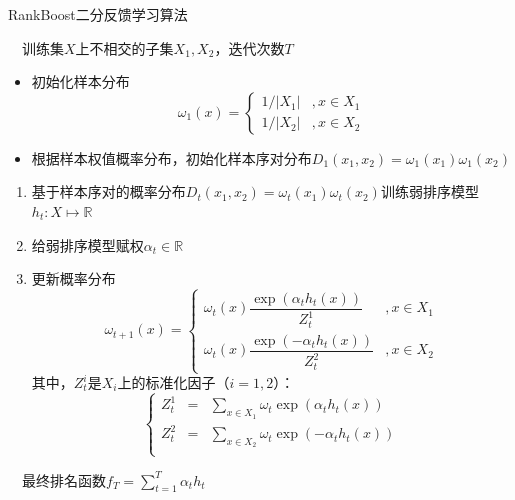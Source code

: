 \begin{algorithm}[htbp]
        \caption{RankBoost二分反馈学习算法}
        \begin{algorithmic}
            \REQUIRE ~~训练集$X$上不相交的子集$X_1,X_2$，迭代次数$T$\\
            \STATE
            \begin{itemize}
              \item 初始化样本分布
              \begin{equation}
                \omega_1(x) = \left\{
                    \begin{array}{ll}
                      1/|X_1| & ,  x\in X_1 \\
                      1/|X_2| & ,  x\in X_2
                    \end{array}
                \right.
              \end{equation}
              \item 根据样本权值概率分布，初始化样本序对分布$D_1(x_1,x_2) = \omega_1(x_1)\omega_1(x_2)$
            \end{itemize}
            \STATE
            \begin{enumerate}
              \item 基于样本序对的概率分布$D_t(x_1,x_2) = \omega_t(x_1)\omega_t(x_2)$训练弱排序模型$h_t:X\mapsto \mathbb{R}$
              \item 给弱排序模型赋权$\alpha_t \in \mathbb{R}$
              \item 更新概率分布
              \begin{equation}
                \omega_{t+1}(x) = \left\{
                    \begin{array}{ll}
                       \omega_t(x)\dfrac{\exp(\alpha_t h_t(x))}{Z_t^1} & , x\in X_1\\
                       \omega_t(x)\dfrac{\exp(-\alpha_t h_t(x))}{Z_t^2} & , x\in X_2
                    \end{array}
                \right.
              \end{equation}
              其中，$Z_t^i$是$X_i$上的标准化因子（$i=1,2$）：
              \begin{equation}
                \left\{
                \begin{array}{lll}
                  Z_t^1 & = & \sum\limits_{x\in X_1} \omega_t \exp(\alpha_t h_t(x))\\
                  Z_t^2 & = & \sum\limits_{x\in X_2} \omega_t \exp(-\alpha_t h_t(x))\\
                \end{array}
                \right.
              \end{equation}
            \end{enumerate}
            \ENDFOR
            \ENSURE ~~最终排名函数$f_T = \sum\limits_{t=1}^{T}{\alpha_t h_t}$
        \end{algorithmic}
\end{algorithm}

